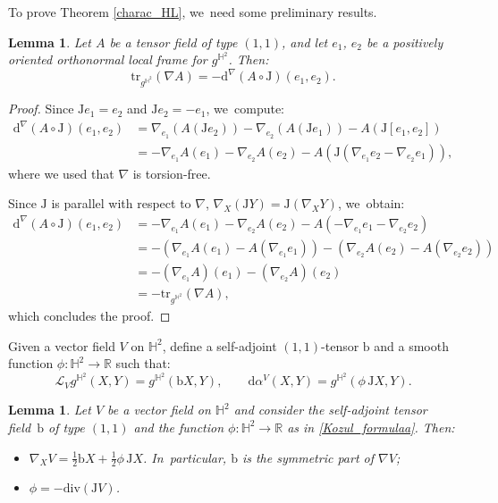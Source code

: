 \documentclass[10pt]{amsart}
\theoremstyle{plain}
\newtheorem{lemma}[cor]{Lemma}
\theoremstyle{definition}
\begin{document}
To prove Theorem \ref{charac_HL}, we~need some preliminary results.

\begin{lemma}\label{techniqual_computation}
Let \(A \) be a tensor field of type \((1,1) \), and let \(e_1 \), \(e_2 \) be a positively oriented orthonormal local frame for \(g^{\mathbb{H}^2} \). Then:
\[
\mathrm{tr}_{g^{\mathbb{H}^2}}(\nabla A) = -\mathrm{d}^{\nabla}(A \circ \mathrm{J})(e_1,e_2).
\]
\end{lemma}

\begin{proof}
Since \(\mathrm{J}e_1 = e_2 \) and \(\mathrm{J}e_2 = -e_1 \), we~compute:
\begin{align*}
\mathrm{d}^{\nabla}(A \circ \mathrm{J})(e_1,e_2)
&= \nabla_{e_1} (A(\mathrm{J}e_2)) - \nabla_{e_2} (A(\mathrm{J}e_1)) - A(\mathrm{J}[e_1, e_2]) \\
&= -\nabla_{e_1} A(e_1) - \nabla_{e_2} A(e_2) - A(\mathrm{J}(\nabla_{e_1}e_2 - \nabla_{e_2}e_1)),
\end{align*}
where we used that \(\nabla \) is torsion-free.

Since \(\mathrm{J} \) is parallel with respect to \(\nabla \), \ie \(\nabla_X(\mathrm{J}Y) = \mathrm{J}(\nabla_X Y) \), we~obtain:
\begin{align*}
\mathrm{d}^{\nabla}(A \circ \mathrm{J})(e_1,e_2)
&= -\nabla_{e_1} A(e_1) - \nabla_{e_2} A(e_2) - A(-\nabla_{e_1}e_1 - \nabla_{e_2}e_2) \\
&= -\left(\nabla_{e_1} A(e_1) - A(\nabla_{e_1} e_1) \right) - \left(\nabla_{e_2} A(e_2) - A(\nabla_{e_2} e_2) \right) \\
&= -(\nabla_{e_1} A)(e_1) - (\nabla_{e_2} A)(e_2) \\
&= -\mathrm{tr}_{g^{\mathbb{H}^2}}(\nabla A),
\end{align*}
which concludes the proof.
\end{proof}

Given a vector field $V$ on $\mathbb{H}^2$, define a self-adjoint $(1,1)$-tensor $\mathrm{b}$ and a smooth function $\phi:\mathbb{H}^2\to\mathbb{R}$ such that:
\begin{equation}\label{Kozul_formulaa}
\mathcal{L}_Vg^{\mathbb{H}^2}(X,Y)=g^{\mathbb{H}^2}(\mathrm{b} X,Y),
\qquad
\mathrm{d}\alpha^V(X,Y)=g^{\mathbb{H}^2}(\phi\, \mathrm{J} X,Y).
\end{equation}

\begin{lemma}\label{Kozul_formula}
Let $V$ be a vector field on $\mathbb{H}^2$ and consider the self-adjoint tensor field~$\mathrm{b}$ of type $(1,1)$ and the function $\phi:\mathbb{H}^2\to \mathbb{R}$ as in \eqref{Kozul_formulaa}. Then:
\begin{itemize}
\item $\nabla_X V = \frac{1}{2} \mathrm{b} X + \frac{1}{2} \phi\, \mathrm{J} X$. In~particular, $\mathrm{b}$ is the symmetric part of $\nabla V$;
\item $\phi = -\mathrm{div}(\mathrm{J} V)$.
\end{itemize}

\end{lemma}
\end{document}
